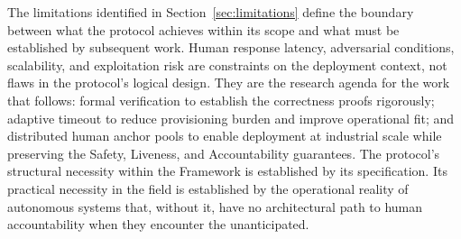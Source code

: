 The limitations identified in Section~\ref{sec:limitations} define the boundary between what the protocol achieves within its scope and what must be established by subsequent work. Human response latency, adversarial conditions, scalability, and exploitation risk are constraints on the deployment context, not flaws in the protocol's logical design. They are the research agenda for the work that follows: formal verification to establish the correctness proofs rigorously; adaptive timeout to reduce provisioning burden and improve operational fit; and distributed human anchor pools to enable deployment at industrial scale while preserving the Safety, Liveness, and Accountability guarantees. The protocol's structural necessity within the \bxthree{} Framework is established by its specification. Its practical necessity in the field is established by the operational reality of autonomous systems that, without it, have no architectural path to human accountability when they encounter the unanticipated.
